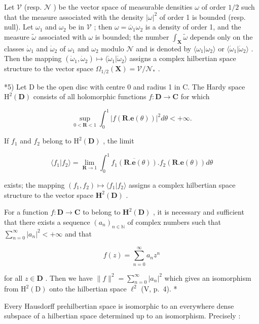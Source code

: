 Let \(\mathcal{V}\) (resp. \(\mathcal{N}\) ) be the vector space of measurable densities \(\omega\) of order \(1/2\) such that the measure associated with the density \(|\omega|^2\) of order 1 is bounded (resp. null). Let \(\omega_1\) and \(\omega_2\) be in \(\mathcal{V}\) ; then \(\omega = \overline{\omega}_1\omega_2\) is a density of order 1, and the measure \(\tilde{\omega}\) associated with \(\omega\) is bounded; the number \(\int_{\mathbf{X}}\tilde{\omega}\) depends only on the classes \(\dot{\omega}_1\) and \(\dot{\omega}_2\) of \(\omega_1\) and \(\omega_2\) modulo \(\mathcal{N}\) and is denoted by \(\langle\omega_1|\omega_2\rangle\) or \(\langle\dot{\omega}_1|\dot{\omega}_2\rangle\) . Then the mapping \((\dot{\omega}_1,\dot{\omega}_2)\mapsto\langle\dot{\omega}_1|\dot{\omega}_2\rangle\) assigns a complex hilbertian space structure to the vector space \(\Omega_{1/2}(\mathbf{X})=\mathcal{V}/\mathcal{N}_{*}\) .

*5) Let D be the open disc with centre 0 and radius 1 in C. The Hardy space \(\mathrm{H}^2 (\mathbf{D})\) consists of all holomorphic functions \(f\colon \mathbf{D}\to \mathbf{C}\) for which

\[
\sup _ {0 <   \mathbf {R} <   1} \int_ {0} ^ {1} | f (\mathbf {R}. \mathbf {e} (\theta)) | ^ {2} d \theta <   + \infty .
\]

If \(f_{1}\) and \(f_{2}\) belong to \(\mathrm{H}^2 (\mathbf{D})\) , the limit

\[
\langle f _ {1} | f _ {2} \rangle = \lim _ {\mathbf {R} \rightarrow 1} \int_ {0} ^ {1} \overline {{{f _ {1} (\mathbf {R} . \mathbf {e} (\theta))}}}. f _ {2} (\mathbf {R}. \mathbf {e} (\theta)) d \theta
\]

exists; the mapping \((f_1, f_2) \mapsto \langle f_1 | f_2 \rangle\) assigns a complex hilbertian space structure to the vector space \(\mathbf{H}^2(\mathbf{D})\) .

For a function \(f: \mathbf{D} \to \mathbf{C}\) to belong to \(\mathbf{H}^2(\mathbf{D})\) , it is necessary and sufficient that there exists a sequence \((a_n)_{n \in \mathbb{N}}\) of complex numbers such that \(\sum_{n=0}^{\infty} |a_n|^2 < +\infty\) and that

\[
f (z) = \sum_ {n = 0} ^ {\infty} a _ {n} z ^ {n}
\]

for all \(z \in \mathbf{D}\) . Then we have \(\| f\|^2 = \sum_{n=0}^{\infty} |a_n|^2\) which gives an isomorphism from \(\mathrm{H}^2(\mathrm{D})\) onto the hilbertian space \(\ell^2\) (V, p.~4). *

Every Hausdorff prehilbertian space is isomorphic to an everywhere dense subspace of a hilbertian space determined up to an isomorphism. Precisely :

